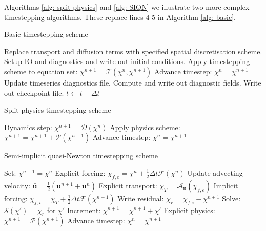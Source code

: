 \documentclass[journal abbreviation, manuscript]{copernicus}
\def\MM#1{\boldsymbol{#1}}
\begin{document}
Algorithms \ref{alg: split physics} and \ref{alg: SIQN} we illustrate
two more complex timestepping algorithms. These replace lines 4-5 in
Algorithm \ref{alg: basic}.

\begin{algorithm} 
  \caption{Basic timestepping scheme}
  \label{alg: basic}
  \begin{algorithmic}[1]
    \STATE Replace transport and diffusion terms with specified spatial discretisation scheme.
    \STATE Setup IO and diagnostics and write out initial conditions.
      \STATE Apply timestepping scheme to equation set: $\chi^{n+1} = \mathcal{T}(\chi^n, \chi^{n+1})$
      \STATE Advance timestep: $\chi^n = \chi^{n+1}$
        \STATE Update timeseries diagnostics file.
      \ENDIF
        \STATE Compute and write out diagnostic fields.
      \ENDIF
        \STATE Write out checkpoint file.
      \ENDIF
      \STATE $t \gets t + \Delta t$
    \ENDWHILE
  \end{algorithmic} 
\end{algorithm}

\begin{algorithm} 
  \caption{Split physics timestepping scheme}
  \label{alg: split physics}
  \begin{algorithmic}[1]
    \STATE Dynamics step: $\chi^{n+1} = \mathcal{D}(\chi^n)$
      \STATE Apply physics scheme: $\chi^{n+1} = \chi^{n+1} + \mathcal{P}(\chi^{n+1})$
    \ENDFOR
    \STATE Advance timestep: $\chi^n = \chi^{n+1}$
  \end{algorithmic} 
\end{algorithm}

\begin{algorithm} 
  \caption{Semi-implicit quasi-Newton timestepping scheme}
  \label{alg: SIQN}
  \begin{algorithmic}[1]
    \STATE Set: $\chi^{n+1} = \chi^{n}$
    \STATE Explicit forcing: $\chi_{f, e} = \chi^n + \frac{1}{2}\Delta t \mathcal{F}(\chi^n)$
      \STATE Update advecting velocity: $\bar{\MM{u}} = \frac{1}{2} (\MM{u}^{n+1} + \MM{u}^n)$
      \STATE Explicit transport: $\chi_T = \mathcal{A}_{\bar{\MM{u}}}(\chi_{f,e})$
        \STATE Implicit forcing: $\chi_{f,i} = \chi_T + \frac{1}{2}\Delta t \mathcal{F}(\chi^{n+1})$
        \STATE Write residual: $\chi_{r} = \chi_{f,i} - \chi^{n+1}$
        \STATE Solve: $\mathcal{S}(\chi') = \chi_{r}$ for $\chi'$
        \STATE Increment: $\chi^{n+1} = \chi^{n+1} + \chi'$
      \ENDFOR
    \ENDFOR
    \STATE Explicit physics: $\chi^{n+1} = \mathcal{P}(\chi^{n+1})$
    \STATE Advance timestep: $\chi^n = \chi^{n+1}$
  \end{algorithmic} 
\end{algorithm}
\end{document}
